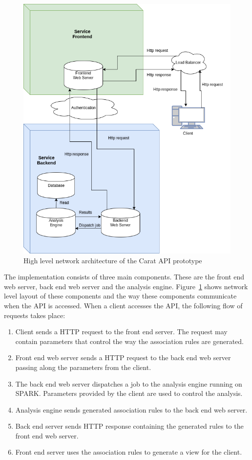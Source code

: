 \begin{figure}[!htbp]
	\centering
	\includegraphics[width=\textwidth]{images/carat-prototype-architecture.png}
	\caption{High level network architecture of the Carat API prototype}
	\label{figure:carat-api-network-prototype}
\end{figure}         

The implementation consists of three main components. These are the front end web server, back end web server and the analysis engine. Figure~\ref{figure:carat-api-network-prototype} shows network level layout of these components and the way these components communicate when the API is accessed. When a client accesses the API, the following flow of requests takes place:
\begin{enumerate}
	\item Client sends a HTTP request to the front end server. The request may contain parameters that control the way the association rules are generated.
	\item Front end web server sends a HTTP request to the back end web server passing along the parameters from the client.
	\item The back end web server dispatches a job to the analysis engine running on SPARK. Parameters provided by the client are used to control the analysis.
	\item Analysis engine sends generated association rules to the back end web server.
	\item Back end server sends HTTP response containing the generated rules to the front end web server.
	\item Front end server uses the association rules to generate a view for the client.  
\end{enumerate}

